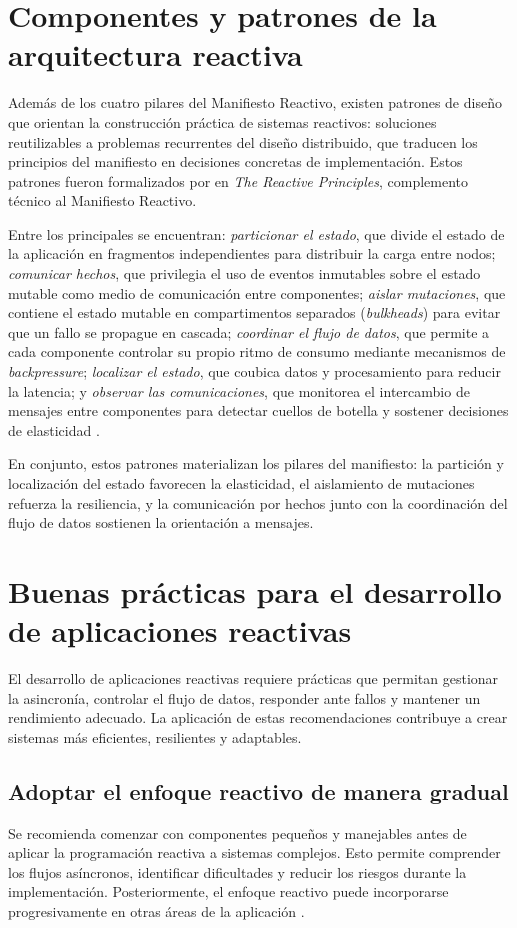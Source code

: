 \documentclass[12pt, letterpaper]{article}
\begin{document}
\section*{Componentes y patrones de la arquitectura reactiva}
Además de los cuatro pilares del Manifiesto Reactivo, existen patrones de diseño que orientan la construcción práctica de sistemas reactivos: soluciones reutilizables a problemas recurrentes del diseño distribuido, que traducen los principios del manifiesto en decisiones concretas de implementación. Estos patrones fueron formalizados por \textcite{boner2022reactive} en \textit{The Reactive Principles}, complemento técnico al Manifiesto Reactivo.

Entre los principales se encuentran: \textit{particionar el estado}, que divide el estado de la aplicación en fragmentos independientes para distribuir la carga entre nodos; \textit{comunicar hechos}, que privilegia el uso de eventos inmutables sobre el estado mutable como medio de comunicación entre componentes; \textit{aislar mutaciones}, que contiene el estado mutable en compartimentos separados (\textit{bulkheads}) para evitar que un fallo se propague en cascada; \textit{coordinar el flujo de datos}, que permite a cada componente controlar su propio ritmo de consumo mediante mecanismos de \textit{backpressure}; \textit{localizar el estado}, que coubica datos y procesamiento para reducir la latencia; y \textit{observar las comunicaciones}, que monitorea el intercambio de mensajes entre componentes para detectar cuellos de botella y sostener decisiones de elasticidad \parencite{boner2022reactive}.

En conjunto, estos patrones materializan los pilares del manifiesto: la partición y localización del estado favorecen la elasticidad, el aislamiento de mutaciones refuerza la resiliencia, y la comunicación por hechos junto con la coordinación del flujo de datos sostienen la orientación a mensajes.

\section*{Buenas prácticas para el desarrollo de aplicaciones reactivas}
El desarrollo de aplicaciones reactivas requiere prácticas que permitan gestionar la asincronía, controlar el flujo de datos, responder ante fallos y mantener un rendimiento adecuado. La aplicación de estas recomendaciones contribuye a crear sistemas más eficientes, resilientes y adaptables.

\subsection*{Adoptar el enfoque reactivo de manera gradual}
Se recomienda comenzar con componentes pequeños y manejables antes de aplicar la programación reactiva a sistemas complejos. Esto permite comprender los flujos asíncronos, identificar dificultades y reducir los riesgos durante la implementación. Posteriormente, el enfoque reactivo puede incorporarse progresivamente en otras áreas de la aplicación \parencites{aiimtech2024understanding}{sousa2025java}.
\end{document}

